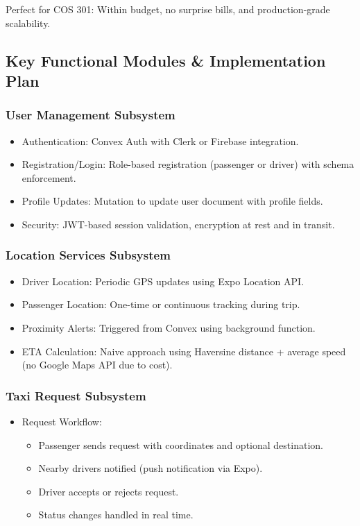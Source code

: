 \documentclass[a4paper,12pt]{article}
\begin{document}
\noindent Perfect for COS 301: Within budget, no surprise bills, and production-grade scalability.

\subsection{Key Functional Modules \& Implementation Plan}

\subsubsection*{User Management Subsystem}
\begin{itemize}
    \item Authentication: Convex Auth with Clerk or Firebase integration.
    \item Registration/Login: Role-based registration (passenger or driver) with schema enforcement.
    \item Profile Updates: Mutation to update user document with profile fields.
    \item Security: JWT-based session validation, encryption at rest and in transit.
\end{itemize}

\subsubsection*{Location Services Subsystem}
\begin{itemize}
    \item Driver Location: Periodic GPS updates using Expo Location API.
    \item Passenger Location: One-time or continuous tracking during trip.
    \item Proximity Alerts: Triggered from Convex using background function.
    \item ETA Calculation: Naive approach using Haversine distance + average speed (no Google Maps API due to cost).
\end{itemize}

\subsubsection*{Taxi Request Subsystem}
\begin{itemize}
    \item Request Workflow:
    \begin{itemize}
        \item Passenger sends request with coordinates and optional destination.
        \item Nearby drivers notified (push notification via Expo).
        \item Driver accepts or rejects request.
        \item Status changes handled in real time.
    \end{itemize}
\end{itemize}
\end{document}
